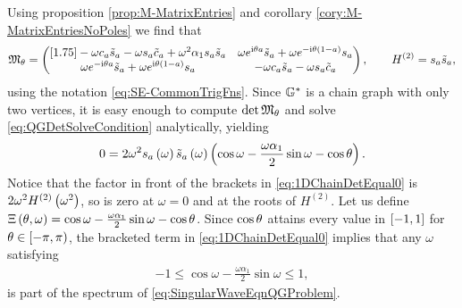 Using proposition \ref{prop:M-MatrixEntries} and corollary \ref{cory:M-MatrixEntriesNoPoles} we find that
\begin{align*}
	\mathfrak{M}_{\theta} = 
	\begin{pmatrix}[1.75]
		-\omega c_a \tilde{s}_a - \omega s_a \tilde{c}_{a} + \omega^2\alpha_1 s_a \tilde{s}_a &
		\omega e^{\mathrm{i}\theta a} \tilde{s}_a + \omega e^{-\mathrm{i}\theta(1-a)} s_a \\
		\omega e^{-\mathrm{i}\theta a} \tilde{s}_a + \omega e^{\mathrm{i}\theta(1-a)} s_a &
		-\omega c_a \tilde{s}_a - \omega s_a \tilde{c}_a
	\end{pmatrix},
	\qquad
	H^{(2)} = s_a \tilde{s}_a,\\
\end{align*}
using the notation \eqref{eq:SE-CommonTrigFns}.
Since $\mathbb{G}^*$ is a chain graph with only two vertices, it is easy enough to compute $\det\mathfrak{M}_{\theta}$ and solve \eqref{eq:QGDetSolveCondition} analytically, yielding
\begin{align} \label{eq:1DChainDetEqual0}
	0 = 2\omega^2 s_a\left( \omega \right) \tilde{s}_a\left( \omega \right) \left(  \cos\omega - \frac{\omega\alpha_1}{2}\sin\omega - \cos\theta  \right).
\end{align}
Notice that the factor in front of the brackets in \eqref{eq:1DChainDetEqual0} is $2\omega^2 H^{(2)}\left( \omega^2 \right)$, so is zero at $\omega=0$ and at the roots of $H^{(2)}$.
Let us define $\Xi\left( \theta,\omega \right) = \cos\omega - \frac{\omega\alpha_1}{2}\sin\omega - \cos\theta$.
Since $\cos\theta$ attains every value in $\left[ -1,1 \right]$ for $\theta\in\left[-\pi,\pi\right)$, the bracketed term in \eqref{eq:1DChainDetEqual0} implies that any $\omega$ satisfying
\begin{align*}
	-1 \leq \cos\omega - \frac{\omega\alpha_1}{2}\sin\omega \leq 1,
\end{align*}
is part of the spectrum of \eqref{eq:SingularWaveEqnQGProblem}.

